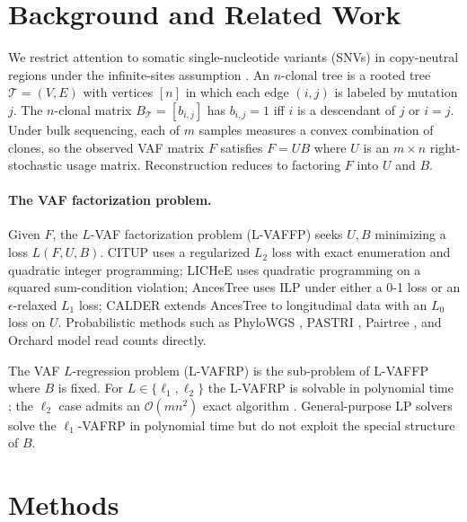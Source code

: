 \documentclass[11pt]{article}
\begin{document}
\section{Background and Related Work}

We restrict attention to somatic single-nucleotide variants (SNVs) in copy-neutral regions under the infinite-sites assumption \cite{elkebir2015ancestree,popic2015lichee,malikic2015citup,deshwar2015phylowgs,satas2017pastri,myers2022calder,wintersinger2022pairtree,kulman2024orchard}. An $n$-clonal tree is a rooted tree $\mathcal{T} = (V,E)$ with vertices $[n]$ in which each edge $(i,j)$ is labeled by mutation $j$. The $n$-clonal matrix $B_{\mathcal{T}} = [b_{i,j}]$ has $b_{i,j} = 1$ iff $i$ is a descendant of $j$ or $i = j$. Under bulk sequencing, each of $m$ samples measures a convex combination of clones, so the observed VAF matrix $F$ satisfies $F = U B$ where $U$ is an $m \times n$ right-stochastic usage matrix. Reconstruction reduces to factoring $F$ into $U$ and $B$.

\paragraph{The VAF factorization problem.} Given $F$, the $L$-VAF factorization problem (L-VAFFP) seeks $U,B$ minimizing a loss $L(F,U,B)$. CITUP \cite{malikic2015citup} uses a regularized $L_2$ loss with exact enumeration and quadratic integer programming; LICHeE \cite{popic2015lichee} uses quadratic programming on a squared sum-condition violation; AncesTree \cite{elkebir2015ancestree} uses ILP under either a 0-1 loss or an $\epsilon$-relaxed $L_1$ loss; CALDER \cite{myers2022calder} extends AncesTree to longitudinal data with an $L_0$ loss on $U$. Probabilistic methods such as PhyloWGS \cite{deshwar2015phylowgs}, PASTRI \cite{satas2017pastri}, Pairtree \cite{wintersinger2022pairtree}, and Orchard \cite{kulman2024orchard} model read counts directly.

The VAF $L$-regression problem (L-VAFRP) is the sub-problem of L-VAFFP where $B$ is fixed. For $L \in \{\ell_1,\ell_2\}$ the L-VAFRP is solvable in polynomial time \cite{boyd2004convex}; the $\ell_2$ case admits an $\mathcal{O}(mn^2)$ exact algorithm \cite{elkebir2016copynumber}. General-purpose LP solvers solve the $\ell_1$-VAFRP in polynomial time but do not exploit the special structure of $B$.

\section{Methods}
\end{document}
